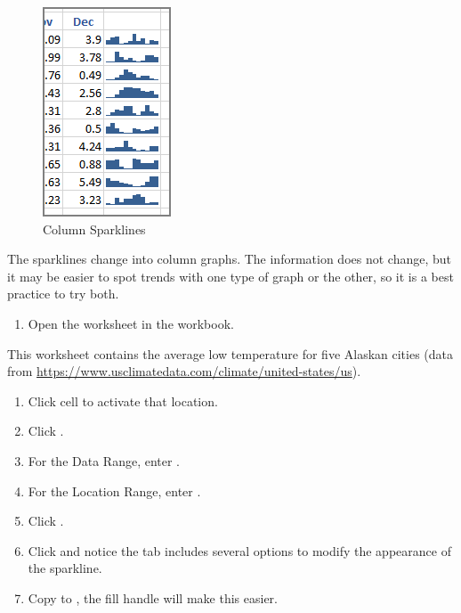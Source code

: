 \begin{figure}[H]
	\centering
	\includegraphics[width=\maxwidth{.95\linewidth}]{gfx/ch08_fig05}
	\caption{Column Sparklines}
	\label{08:fig05}
\end{figure}

The sparklines change into column graphs. The information does not change, but it may be easier to spot trends with one type of graph or the other, so it is a best practice to try both.

\begin{enumerate}[resume]
	\item Open the  worksheet in the  workbook.
\end{enumerate}

This worksheet contains the average low temperature for five Alaskan cities (data from  \url{https://www.usclimatedata.com/climate/united-states/us}).

\begin{enumerate}[resume]
	\item Click cell  to activate that location.
	\item Click .
	\item For the Data Range, enter .
	\item For the Location Range, enter .
	\item Click .
	\item Click  and notice the  tab includes several options to modify the appearance of the sparkline. 
	\item Copy  to , the fill handle will make this easier.
\end{enumerate}

